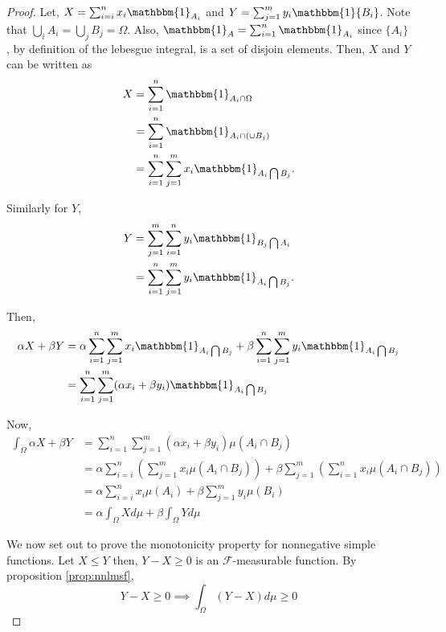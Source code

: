 \documentclass[11pt]{report}
\newcommand{\ind}{\mathbbm{1}}
\newcommand{\salgF}{\mathscr{F}}
\begin{document}
\begin{proof}
	Let, $X = \sum_{i=i}^{n}x_i\ind_{A_i}$ and $Y = \sum_{j=1}^{m}y_i\ind{B_i}$. Note that $\bigcup_i A_i = \bigcup_j B_j = \Omega$. Also, $\ind_A = \sum_{i=1}^{n}\ind_{A_i}$ since $\{A_i\}$, by definition of the lebesgue integral, is a set of disjoin elements. Then, $X$ and $Y$ can be written as
	\begin{align*}
		X	&= \sum_{i=1}^{n}\ind_{A_i\cap\Omega} \\
			&= \sum_{i=1}^{n}\ind_{A_i\cap\left(\cup B_j\right)}\\
			&= \sum_{i=1}^{n} \sum_{j=1}^{m} x_i \ind_{A_i \bigcap B_j}.
	\end{align*}
	
	Similarly for $Y$,
	\begin{align*}
		Y	&= \sum_{j=1}^{m} \sum_{i=1}^{n} y_i \ind_{B_j \bigcap A_i} \\
			&= \sum_{i=1}^{n} \sum_{j=1}^{m} y_i \ind_{A_i \bigcap B_j}.
	\end{align*}
	
	Then,
	\begin{align*}
		\alpha X + \beta Y  &= \alpha \sum_{i=1}^{n} \sum_{j=1}^{m} x_i \ind_{A_i \bigcap B_j} + \beta \sum_{i=1}^{n} \sum_{j=1}^{m} y_i \ind_{A_i \bigcap B_j} \\
				&= \sum_{i=1}^{n} \sum_{j=1}^{m} (\alpha x_i + \beta y_i) \ind_{A_i \bigcap B_j}
	\end{align*}
	
	Now, 
	\begin{align*}
		\int_\Omega\alpha X+\beta Y &= \sum_{i=1}^{n} \sum_{j=1}^{m} (\alpha x_i + \beta y_i) \mu(A_i \cap B_j) \\
		&= \alpha \sum_{i=i}^{n}\left(\sum_{j=1}^{m} x_i \mu(A_i\cap B_j) \right) + \beta \sum_{j=1}^{m}\left(\sum_{i=1}^{n} x_i \mu(A_i\cap B_j) \right)\\
		&= \alpha \sum_{i=i}^{n}x_i \mu(A_i) + \beta\sum_{j=1}^{m} y_i \mu(B_i) \\
		&= \alpha \int_\Omega X d\mu + \beta\int_\Omega Y d\mu
	\end{align*}
	
	We now set out to prove the monotonicity property for nonnegative simple functions. 
	Let $X \leq Y$ then, $Y - X \geq 0$ is an $\salgF$-measurable function. By proposition \ref{prop:nnlmsf},
	\begin{equation}
		Y - X \geq 0 \implies \int_\Omega (Y - X) d\mu \geq 0
	\end{equation}
	
\end{proof}
\end{document}
